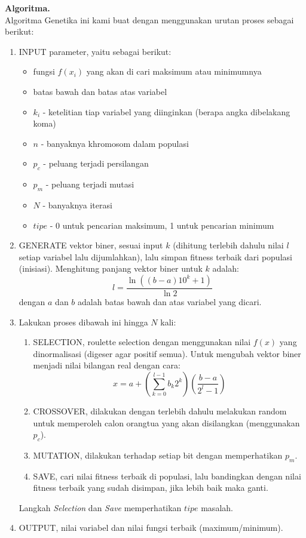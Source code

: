 \documentclass[paper=a4, fontsize=11pt]{scrartcl}
\numberwithin{equation}{section} %
\numberwithin{figure}{section} %
\numberwithin{table}{section} %
\begin{document}
\newpage
\large \textbf{Algoritma.}\\
Algoritma Genetika ini kami buat dengan menggunakan urutan proses sebagai berikut:
\begin{enumerate}
\item INPUT parameter, yaitu sebagai berikut:
\begin{itemize}
\item fungsi $f(x_{i})$ yang akan di cari maksimum atau minimumnya
\item batas bawah dan batas atas variabel
\item $k_{i}$ - ketelitian tiap variabel yang diinginkan (berapa angka dibelakang koma)
\item $n$ - banyaknya khromosom dalam populasi
\item $p_{c}$ - peluang terjadi persilangan
\item $p_{m}$ - peluang terjadi mutasi
\item $N$ - banyaknya iterasi 
\item $tipe$ - 0 untuk pencarian maksimum, 1 untuk pencarian minimum
\end{itemize}

\item GENERATE vektor biner, sesuai input $k$ (dihitung terlebih dahulu nilai $l$ setiap variabel lalu dijumlahkan), lalu simpan fitness terbaik dari populasi (inisiasi). Menghitung panjang vektor biner untuk $k$   adalah:
\begin{equation*}
l = \frac{\ln((b-a) 10^{k} + 1)}{\ln 2}
\end{equation*}
dengan $a$ dan $b$ adalah batas bawah dan atas variabel yang dicari.

\item Lakukan proses dibawah ini hingga $N$ kali:
\begin{enumerate}
\item SELECTION, roulette selection dengan menggunakan nilai $f(x)$ yang dinormalisasi (digeser agar positif semua). Untuk mengubah vektor biner menjadi nilai bilangan real dengan cara:
\begin{equation*}
x = a + (\sum_{k=0}^{l-1} b_{k} 2^{k})(\frac{b-a}{2^{l} - 1})
\end{equation*}

\item CROSSOVER, dilakukan dengan terlebih dahulu melakukan random untuk memperoleh calon orangtua yang akan disilangkan (menggunakan $p_{c}$).

\item MUTATION, dilakukan terhadap setiap bit dengan memperhatikan $p_{m}$. 

\item SAVE, cari nilai fitness terbaik di populasi, lalu bandingkan dengan nilai fitness terbaik yang sudah disimpan, jika lebih baik maka ganti.
\end{enumerate}
Langkah \textit{Selection} dan \textit{Save} memperhatikan $tipe$ masalah.
\item OUTPUT, nilai variabel dan nilai fungsi terbaik (maximum/minimum).
\end{enumerate}
\end{document}
